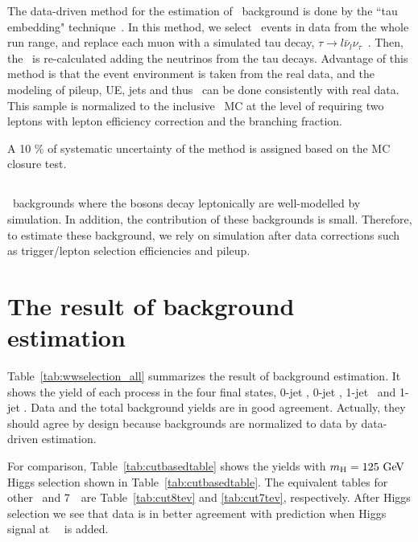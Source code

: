 The data-driven method for the estimation of \ztt\ background is done by the 
``tau embedding" technique~\cite{Chatrchyan:2014nva}. 
In this method, we select \dymm\ events in data
from the whole run range, 
and replace each muon with a simulated tau decay, 
$\tau \rightarrow l\bar{\nu}_l\nu_\tau$~\cite{Jadach:1990mz}. 
Then, the \met\ is re-calculated adding the neutrinos from the tau decays. 
Advantage of this method is that the event environment is taken from the real data, 
and the modeling of pileup, UE, jets and thus \met\ can be done consistently 
with real data. This sample is normalized to the inclusive \ztt\ MC 
at the level of requiring two leptons with lepton efficiency correction
and the branching fraction.

A 10 \% of systematic uncertainty of the method is assigned based on the MC closure test. 

\subsection{\vv} 

\vv\ backgrounds where the bosons decay leptonically are well-modelled by simulation.
In addition, the contribution of these backgrounds is small. Therefore, to estimate these 
background, we rely on simulation after data corrections 
such as trigger/lepton selection efficiencies and pileup.  



\section{ The result of background estimation }

Table~\ref{tab:wwselection_all} summarizes the result of background estimation. 
It shows the yield of each process in the four final states, 0-jet \SF, 0-jet \DF,  
1-jet \SF\ and 1-jet \DF. Data and the total background yields are in good agreement. 
Actually, they should agree by design because backgrounds are normalized to data
by data-driven estimation. 

For comparison, Table~\ref{tab:cutbasedtable} shows the yields with $m_{\mathrm{H}}=125~\mathrm{Ge\kern -0.1em V}$ Higgs 
selection shown in Table~\ref{tab:cutbasedtable}. The equivalent tables for other \mHi\ and 
7~\TeV\ are Table~\ref{tab:cut8tev} and \ref{tab:cut7tev}, respectively. 
After Higgs selection we see that data is in better agreement with prediction 
when Higgs signal at ~\GeV\ is added. 

